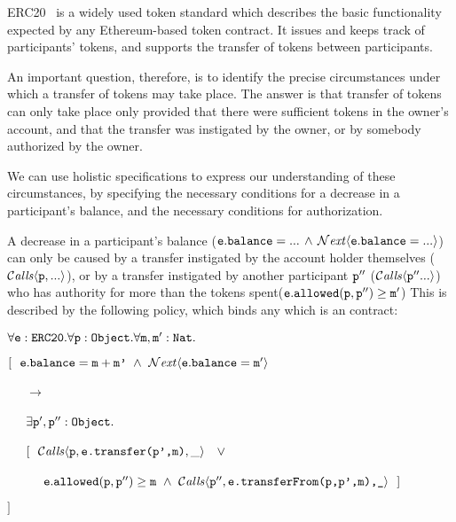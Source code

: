  
 ERC20~\cite{ERC20} is a widely used token standard which describes the 
 basic functionality expected by any    Ethereum-based token contract. 
 It issues and keeps track of participants' tokens, and supports the  transfer
 of tokens between participants. 


An important question, therefore, is to identify the precise circumstances under which a transfer of tokens may take place.
The answer is that transfer of tokens 
 can only take place only provided that  there were sufficient tokens in the
 owner's account, and that
 the transfer was instigated by the owner, or by somebody authorized
 by the owner.

We can use holistic specifications to express our understanding of
these circumstances, by specifying the necessary conditions for a
decrease in a participant's balance, and the necessary conditions for
authorization.

A decrease in  a participant's balance 
(\ie  ${\mbox{\tt{e}}}.{\mbox{\tt{balance}}}=...\, \wedge\, {\mathcal{N}}\textrm{\textit{ext}}\langle {\mbox{\tt{e}}}.{\mbox{\tt{balance}}}=...\rangle$)
can only be caused by a transfer instigated by the 
account holder themselves (\ie ${\mathcal{C}}\textrm{\textit{alls}}\langle {\mbox{\tt{p}}}, ...\rangle$), or by
a transfer instigated by another participant ${\mbox{\tt{p}}}''$  (\ie ${\mathcal{C}}\textrm{\textit{alls}}\langle {\mbox{\tt{p}}}''...\rangle$) who 
has authority for more than the tokens spent(\ie  ${\mbox{\tt{e}}}.{\mbox{\tt{allowed}}}({\mbox{\tt{p}}},{\mbox{\tt{p}}}'')\geq {\mbox{\tt{m}}}'$)
This is described by the following policy, which
binds any  which is an   contract:

\vspace{.15cm}
\noindent
$\forall {\mbox{\tt{e}}}:{\mbox{\tt{ERC20}}}.\forall {\mbox{\tt{p}}}:{\mbox{\tt{Object}}}.\forall {\mbox{\tt{m}}},{\mbox{\tt{m}}}':{\mbox{\tt{Nat}}}.$\\
\strut \hspace{0.3cm} $[\ \ \prg{e}.\prg{balance}=\prg{m}+\prg{m'}\ \wedge \ \Next{\prg{e}.\prg{balance}=\prg{m}'}$ \\ %
\strut \hspace{0.4cm} \ \ \ $\longrightarrow$\\
\strut \hspace{0.4cm} \ \ \ $\exists {\mbox{\tt{p}}}',{\mbox{\tt{p}}}'':{\mbox{\tt{Object}}}.$ \\
\strut \hspace{0.4cm} \ \ \  $[\ \  \Calls{\prg{p},\prg{e.transfer(p',m)},\_} \  \  \ \vee\, $\\
\strut \hspace{0.4cm} \ \ \   $\ \ \ \ \prg{e}.\prg{allowed}(\prg{p},\prg{p}'')\geq \prg{m} \ \wedge \ \Calls{\prg{p}'',\prg{e.transferFrom(p,p',m),\_}}\       \  ]$\\
\strut \hspace{0.3cm} $] $
\vspace{.15cm}

